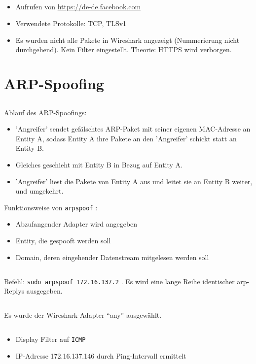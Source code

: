 \documentclass[twoside]{article}
\newcommand{\ttt}[1]{%
	\texttt{#1}%
}
\begin{document}
\subsection{}
\begin{itemize}
	\item Aufrufen von \url{https://de-de.facebook.com}
	\item Verwendete Protokolle: TCP, TLSv1
	\item Es wurden nicht alle Pakete in Wireshark angezeigt (Nummerierung nicht durchgehend).
	Kein Filter eingestellt.
	Theorie: HTTPS wird verborgen.
\end{itemize}



\section{ARP-Spoofing}
\subsection{}
Ablauf des ARP-Spoofings:
\begin{itemize}
	\item 'Angreifer' sendet gefälschtes ARP-Paket mit seiner eigenen MAC-Adresse an Entity A, sodass Entity A ihre Pakete an den 'Angreifer' schickt statt an Entity B.
	\item Gleiches geschieht mit Entity B in Bezug auf Entity A.
	\item 'Angreifer' liest die Pakete von Entity A aus und leitet sie an Entity B weiter, und umgekehrt.
\end{itemize}
Funktionsweise von \ttt{arpspoof}:
\begin{itemize}
	\item Abzufangender Adapter wird angegeben
	\item Entity, die gespooft werden soll
	\item Domain, deren eingehender Datenstream mitgelesen werden soll
\end{itemize}
\subsection{}
Befehl: \ttt{sudo arpspoof 172.16.137.2}.
Es wird eine lange Reihe identischer arp-Replys ausgegeben.
\subsection{}
Es wurde der Wireshark-Adapter ``any'' ausgewählt.
\subsection{}
\begin{itemize}
	\item Display Filter auf \ttt{ICMP}
	\item IP-Adresse 172.16.137.146 durch Ping-Intervall ermittelt
\end{itemize}
\end{document}
